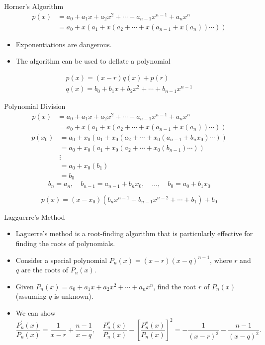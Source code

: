 \documentclass{beamer}
\begin{document}
\begin{frame}{Horner's Algorithm}
$$
\begin{aligned}
p(x) & =a_0+a_1 x+a_2 x^2+\cdots+a_{n-1} x^{n-1}+a_n x^n \\
& =a_0+x\left(a_1+x\left(a_2+\cdots+x\left(a_{n-1}+x\left(a_n\right)\right) \cdots\right)\right)
\end{aligned}
$$
\begin{itemize}
  \item Exponentiations are dangerous.
  \item The algorithm can be used to deflate a polynomial
\end{itemize}

\[
\begin{gathered}
p(x)=(x-r) q(x)+p(r) \\
q(x)=b_0+b_1 x+b_2 x^2+\cdots+b_{n-1} x^{n-1}
\end{gathered}
\]

\end{frame}
\begin{frame}{Polynomial Division}
$$
\begin{aligned}
p(x) & =a_0+a_1 x+a_2 x^2+\cdots+a_{n-1} x^{n-1}+a_n x^n \\
& =a_0+x\left(a_1+x\left(a_2+\cdots+x\left(a_{n-1}+x\left(a_n\right)\right) \cdots\right)\right)
\end{aligned}
$$
$$
\begin{aligned}
p\left(x_0\right) & =a_0+x_0\left(a_1+x_0\left(a_2+\cdots+x_0\left(a_{n-1}+b_n x_0\right) \cdots\right)\right) \\
& =a_0+x_0\left(a_1+x_0\left(a_2+\cdots+x_0\left(b_{n-1}\right) \cdots\right)\right) \\
& \vdots \\
& =a_0+x_0\left(b_1\right) \\
& =b_0
\end{aligned}
$$
$$
b_n  =a_n, \quad b_{n-1}=a_{n-1}+b_n x_0, \quad \ldots, \quad b_0=a_0+b_1 x_0
$$

$$
p(x)=\left(x-x_0\right)\left(b_n x^{n-1}+b_{n-1} x^{n-2}+\cdots+b_1\right)+b_0
$$
\end{frame}

\begin{frame}{Lagguerre's Method}
  \begin{itemize}
    \item Laguerre's method is a root-finding algorithm that is particularly effective for finding the roots of polynomials.
    \item Consider a special polynomial $P_n(x)=(x-r)(x-q)^{n-1}$, where $r$ and $q$ are the roots of $P_n(x)$.
    \item Given $P_n(x)=a_0+a_1 x+a_2 x^2+\cdots+a_n x^n$, find the root $r$ of $P_n(x)$ (assuming $q$ is unknown).
    \item We can show 
    $$
    \frac{P_n^{\prime}(x)}{P_n(x)}=\frac{1}{x-r}+\frac{n-1}{x-q}, \quad \frac{P_n^v(x)}{P_n(x)}-\left[\frac{P_n^v(x)}{P_n(x)}\right]^2=-\frac{1}{(x-r)^2}-\frac{n-1}{(x-q)^2}.
    $$
  \end{itemize}
\end{frame}
\end{document}
